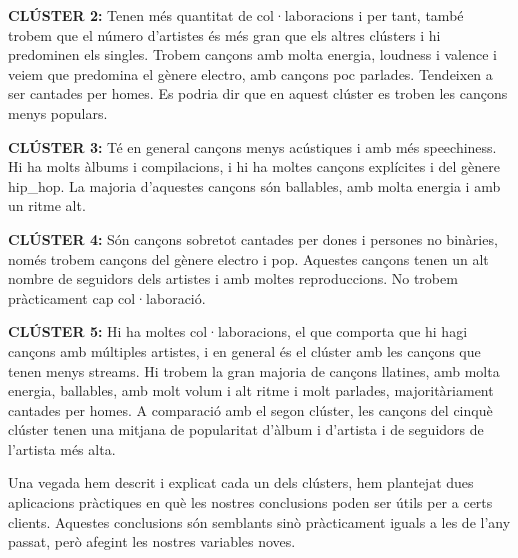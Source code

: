 
\textbf{CLÚSTER 2:} Tenen més quantitat de col·laboracions i per tant, també trobem que el número d'artistes és més gran que els altres clústers i hi predominen els singles. Trobem cançons amb molta energia, loudness i  valence i veiem que predomina el gènere electro, amb cançons poc parlades. Tendeixen a ser cantades per homes. Es podria dir que en aquest clúster es troben les cançons menys populars.


\textbf{CLÚSTER 3:} Té en general cançons menys acústiques i amb més speechiness. Hi ha molts àlbums i compilacions, i hi ha moltes cançons explícites i del gènere hip\_hop. La majoria d'aquestes cançons són ballables, amb molta energia i amb un ritme alt.


\textbf{CLÚSTER 4:} Són cançons sobretot cantades per dones i persones no binàries, només trobem cançons del gènere electro i pop. Aquestes cançons tenen un alt nombre de seguidors dels artistes i amb moltes reproduccions. No trobem pràcticament cap col·laboració.  


\textbf{CLÚSTER 5:} Hi ha moltes col·laboracions, el que comporta que hi hagi cançons amb múltiples artistes, i en general és el clúster amb les cançons que tenen menys streams. Hi trobem la gran majoria de cançons llatines, amb molta energia, ballables, amb molt volum i alt ritme i molt parlades, majoritàriament cantades per homes. A comparació amb el segon clúster, les cançons del cinquè clúster tenen una mitjana de popularitat d'àlbum i d'artista i de seguidors de l'artista més alta.


Una vegada hem descrit i explicat cada un dels clústers, hem plantejat dues aplicacions pràctiques en què les nostres conclusions poden ser útils per a certs clients. Aquestes conclusions són semblants sinò pràcticament iguals a les de l'any passat, però afegint les nostres variables noves. 

